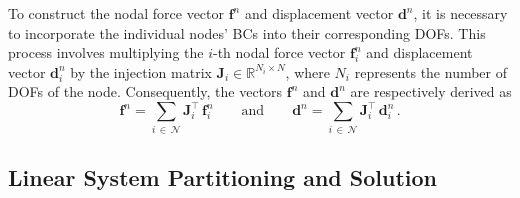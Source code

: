 To construct the nodal force vector $\mathbf{f}^{n}$ and displacement vector $\mathbf{d}^{n}$, it is necessary to incorporate the individual nodes' \acp{BC} into their corresponding \acp{DOF}. This process involves multiplying the $i$-th nodal force vector $\mathbf{f}^{n}_{i}$ and displacement vector $\mathbf{d}^{n}_{i}$ by the injection matrix $\mathbf{J}_{i} \in \mathbb{R}^{N_i \times N}$, where $N_i$ represents the number of \acp{DOF} of the node. Consequently, the vectors $\mathbf{f}^{n}$ and $\mathbf{d}^{n}$ are respectively derived as
%
\begin{equation}
  \mathbf{f}^{n} = \sum_{i \, \in \, \mathcal{N}} \mathbf{J}_{i}^\top \, \mathbf{f}^{n}_{i}
  \qquad \text{and} \qquad
  \mathbf{d}^{n} = \sum_{i \, \in \, \mathcal{N}} \mathbf{J}_{i}^\top \, \mathbf{d}^{n}_{i} \, \text{.}
\end{equation}

\subsection{Linear System Partitioning and Solution}

